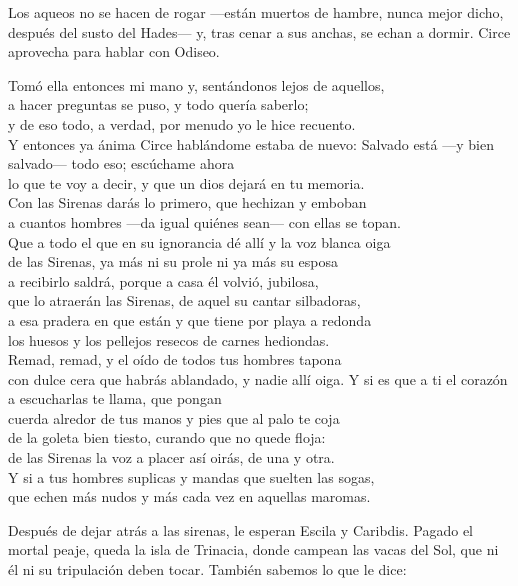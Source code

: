 Los aqueos no se hacen de rogar ---están muertos de hambre, nunca mejor dicho, después del susto del Hades--- y, tras cenar a sus anchas, se echan a dormir. Circe aprovecha para hablar con Odiseo.

\begin{versocita}
Tomó ella entonces mi mano y, sentándonos lejos de aquellos,\\
a hacer preguntas se puso, y todo quería saberlo;\\
y de eso todo, a verdad, por menudo yo le hice recuento.\\
Y entonces ya ánima Circe hablándome estaba de nuevo:
\stanzabreak
Salvado está ---y bien salvado--- todo eso; escúchame ahora\\
lo que te voy a decir, y que un dios dejará en tu memoria.\\
Con las Sirenas darás lo primero, que hechizan y emboban\\
a cuantos hombres ---da igual quiénes sean--- con ellas se topan.\\
Que a todo el que en su ignorancia dé allí y la voz blanca oiga\\
de las Sirenas, ya más ni su prole ni ya más su esposa\\
a recibirlo saldrá, porque a casa él volvió, jubilosa,\\
que lo atraerán las Sirenas, de aquel su cantar silbadoras,\\
a esa pradera en que están y que tiene por playa a redonda\\
los huesos y los pellejos resecos de carnes hediondas.\\
Remad, remad, y el oído de todos tus hombres tapona\\
con dulce cera que habrás ablandado, y nadie allí oiga.
\stanzabreak
Y si es que a ti el corazón a escucharlas te llama, que pongan\\
cuerda alredor de tus manos y pies que al palo te coja\\
de la goleta bien tiesto, curando que no quede floja:\\
de las Sirenas la voz a placer así oirás, de una y otra.\\
Y si a tus hombres suplicas y mandas que suelten las sogas,\\
que echen más nudos y más cada vez en aquellas maromas.
\end{versocita}

Después de dejar atrás a las sirenas, le esperan Escila y Caribdis. Pagado el mortal peaje, queda la isla de Trinacia, donde campean las vacas del Sol, que ni él ni su tripulación deben tocar. También sabemos lo que le dice:

